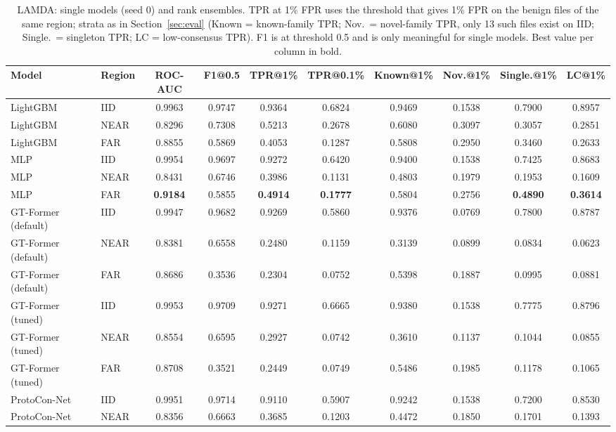 \documentclass[fleqn,10pt]{wlscirep}
\makeatletter
\newcommand{\gtf}{GT\mbox{-}Former}
\newcommand{\lgbm}{LightGBM}
\newcommand{\tprat}[1]{TPR@#1\%}
\makeatother
\begin{document}
\begin{table}[!htbp]
\centering
\scriptsize
\setlength{\tabcolsep}{2.5pt}
\caption{LAMDA: single models (seed 0) and rank ensembles. TPR at 1\% FPR uses the threshold that gives 1\% FPR on the benign files of the same region; strata as in Section~\ref{sec:eval} (Known = known-family TPR; Nov.\ = novel-family TPR, only 13 such files exist on IID; Single.\ = singleton TPR; LC = low-consensus TPR). F1 is at threshold 0.5 and is only meaningful for single models. Best value per column in bold.}
\label{tab:lamda}
\begin{tabular}{llcccccccc}
\toprule
Model & Region & ROC-AUC & F1@0.5 & \tprat{1} & \tprat{0.1} & Known@1\% & Nov.@1\% & Single.@1\% & LC@1\% \\
\midrule
\lgbm{} & IID & 0.9963 & 0.9747 & 0.9364 & 0.6824 & 0.9469 & 0.1538 & 0.7900 & 0.8957 \\
\lgbm{} & NEAR & 0.8296 & 0.7308 & 0.5213 & 0.2678 & 0.6080 & 0.3097 & 0.3057 & 0.2851 \\
\lgbm{} & FAR & 0.8855 & 0.5869 & 0.4053 & 0.1287 & 0.5808 & 0.2950 & 0.3460 & 0.2633 \\
MLP & IID & 0.9954 & 0.9697 & 0.9272 & 0.6420 & 0.9400 & 0.1538 & 0.7425 & 0.8683 \\
MLP & NEAR & 0.8431 & 0.6746 & 0.3986 & 0.1131 & 0.4803 & 0.1979 & 0.1953 & 0.1609 \\
MLP & FAR & \textbf{0.9184} & 0.5855 & \textbf{0.4914} & \textbf{0.1777} & 0.5804 & 0.2756 & \textbf{0.4890} & \textbf{0.3614} \\
\gtf{} (default) & IID & 0.9947 & 0.9682 & 0.9269 & 0.5860 & 0.9376 & 0.0769 & 0.7800 & 0.8787 \\
\gtf{} (default) & NEAR & 0.8381 & 0.6558 & 0.2480 & 0.1159 & 0.3139 & 0.0899 & 0.0834 & 0.0623 \\
\gtf{} (default) & FAR & 0.8686 & 0.3536 & 0.2304 & 0.0752 & 0.5398 & 0.1887 & 0.0995 & 0.0881 \\
\gtf{} (tuned) & IID & 0.9953 & 0.9709 & 0.9271 & 0.6665 & 0.9380 & 0.1538 & 0.7775 & 0.8796 \\
\gtf{} (tuned) & NEAR & 0.8554 & 0.6595 & 0.2927 & 0.0742 & 0.3610 & 0.1137 & 0.1044 & 0.0855 \\
\gtf{} (tuned) & FAR & 0.8708 & 0.3521 & 0.2449 & 0.0749 & 0.5486 & 0.1985 & 0.1178 & 0.1065 \\
ProtoCon-Net & IID & 0.9951 & 0.9714 & 0.9110 & 0.5907 & 0.9242 & 0.1538 & 0.7200 & 0.8530 \\
ProtoCon-Net & NEAR & 0.8356 & 0.6663 & 0.3685 & 0.1203 & 0.4472 & 0.1850 & 0.1701 & 0.1393 \\

\end{tabular}
\end{table}
\end{document}
